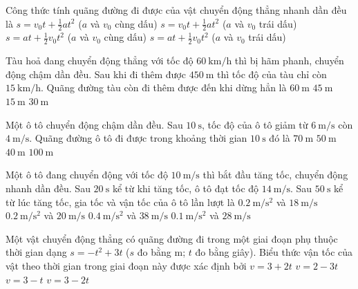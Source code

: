 \begin{ex}
Công thức tính quãng đường đi được của vật chuyển động thẳng nhanh dần đều là	
	\choice
	{\True $s=v_0t+\frac{1}{2}at^2$ ($a$ và $v_0$ cùng dấu)}
	{$s=v_0t+\frac{1}{2}at^2$ ($a$ và $v_0$ trái dấu)}
	{$s=at+\frac{1}{2}v_0t^2$ ($a$ và $v_0$ cùng dấu)}
	{$s=at+\frac{1}{2}v_0t^2$ ($a$ và $v_0$ trái dấu)}
	\loigiai{}
\end{ex}
\begin{ex}
Tàu hoả đang chuyển động thẳng với tốc độ $\SI{60}{\kilo\meter/\hour}$ thì bị hãm phanh, chuyển động chậm dần đều. Sau khi đi thêm được $\SI{450}{\meter}$ thì tốc độ của tàu chỉ còn $\SI{15}{\kilo\meter/\hour}$. Quãng đường tàu còn đi thêm được đến khi dừng hẳn là	
	\choice
	{$\SI{60}{\meter}$}
	{$\SI{45}{\meter}$}
	{$\SI{15}{\meter}$}
	{\True $\SI{30}{\meter}$}
	\loigiai{}
\end{ex}
\begin{ex}
Một ô tô chuyển động chậm dần đều. Sau $\SI{10}{\second}$, tốc độ của ô tô giảm từ $\SI{6}{\meter/\second}$ còn $\SI{4}{\meter/\second}$. Quãng đường ô tô đi được trong khoảng thời gian $\SI{10}{\second}$ đó là	
	\choice
	{$\SI{70}{\meter}$}
	{$\SI{50}{\meter}$}
	{$\SI{40}{\meter}$}
	{\True $\SI{100}{\meter}$}
	\loigiai{}
\end{ex}
\begin{ex}
Một ô tô đang chuyển động với tốc độ $\SI{10}{\meter/\second}$ thì bắt đầu tăng tốc, chuyển động nhanh dần đều. Sau $\SI{20}{\second}$ kể từ khi tăng tốc, ô tô đạt tốc độ $\SI{14}{\meter/\second}$. Sau $\SI{50}{\second}$ kể từ lúc tăng tốc, gia tốc và vận tốc của ô tô lần lượt là	
	\choice
	{$\SI{0.2}{\meter/\second^2}$ và $\SI{18}{\meter/\second}$}
	{\True $\SI{0.2}{\meter/\second^2}$ và $\SI{20}{\meter/\second}$}
	{$\SI{0.4}{\meter/\second^2}$ và $\SI{38}{\meter/\second}$}
	{$\SI{0.1}{\meter/\second^2}$ và $\SI{28}{\meter/\second}$}
	\loigiai{}
\end{ex}
\begin{ex}
	Một vật chuyển động thẳng có quãng đường đi trong một giai đoạn phụ thuộc thời gian dạng $s=-t^2+3t$ ($s$ đo bằng $\si{\meter}$; $t$ đo bằng giây). Biểu thức vận tốc của vật theo thời gian trong giai đoạn này được xác định bởi
	\choice
	{$v=3+2t$}
	{$v=2-3t$}
	{$v=3-t$}
	{\True $v=3-2t$}
	\loigiai{}
\end{ex}


